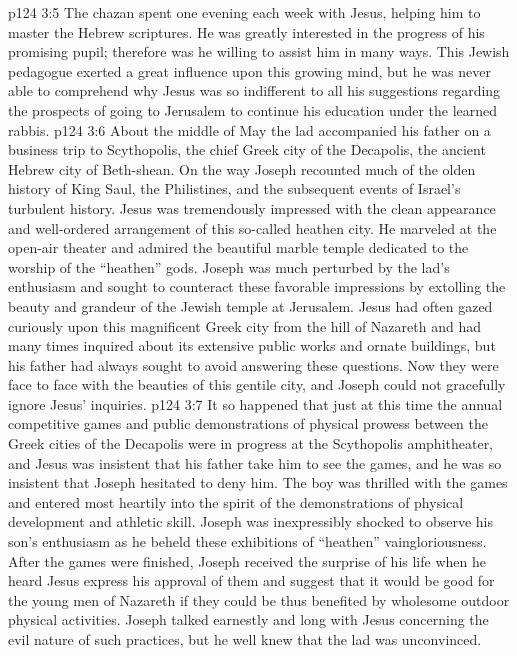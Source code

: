 \vs p124 3:5 The chazan spent one evening each week with Jesus, helping him to master the Hebrew scriptures. He was greatly interested in the progress of his promising pupil; therefore was he willing to assist him in many ways. This Jewish pedagogue exerted a great influence upon this growing mind, but he was never able to comprehend why Jesus was so indifferent to all his suggestions regarding the prospects of going to Jerusalem to continue his education under the learned rabbis.
\pc \vs p124 3:6 About the middle of May the lad accompanied his father on a business trip to Scythopolis, the chief Greek city of the Decapolis, the ancient Hebrew city of Beth\hyp{}shean. On the way Joseph recounted much of the olden history of King Saul, the Philistines, and the subsequent events of Israel’s turbulent history. Jesus was tremendously impressed with the clean appearance and well\hyp{}ordered arrangement of this so\hyp{}called heathen city. He marveled at the open\hyp{}air theater and admired the beautiful marble temple dedicated to the worship of the “heathen” gods. Joseph was much perturbed by the lad’s enthusiasm and sought to counteract these favorable impressions by extolling the beauty and grandeur of the Jewish temple at Jerusalem. Jesus had often gazed curiously upon this magnificent Greek city from the hill of Nazareth and had many times inquired about its extensive public works and ornate buildings, but his father had always sought to avoid answering these questions. Now they were face to face with the beauties of this gentile city, and Joseph could not gracefully ignore Jesus’ inquiries.
\vs p124 3:7 It so happened that just at this time the annual competitive games and public demonstrations of physical prowess between the Greek cities of the Decapolis were in progress at the Scythopolis amphitheater, and Jesus was insistent that his father take him to see the games, and he was so insistent that Joseph hesitated to deny him. The boy was thrilled with the games and entered most heartily into the spirit of the demonstrations of physical development and athletic skill. Joseph was inexpressibly shocked to observe his son’s enthusiasm as he beheld these exhibitions of “heathen” vaingloriousness. After the games were finished, Joseph received the surprise of his life when he heard Jesus express his approval of them and suggest that it would be good for the young men of Nazareth if they could be thus benefited by wholesome outdoor physical activities. Joseph talked earnestly and long with Jesus concerning the evil nature of such practices, but he well knew that the lad was unconvinced.
